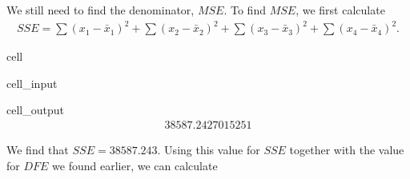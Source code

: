 \documentclass[letterpaper,10pt,english]{jupyterBook}
\begin{document}
\sphinxAtStartPar
We still need to find the denominator, \(MSE\). To find \(MSE\), we first calculate
\begin{equation*}
\begin{split}SSE = \sum (x_1 - \bar{x}_1)^2 + \sum (x_2 - \bar{x}_2)^2 + \sum (x_3 - \bar{x}_3)^2 + \sum(x_4 - \bar{x}_4)^2.\end{split}
\end{equation*}
\begin{sphinxuseclass}{cell}\begin{sphinxVerbatimInput}

\begin{sphinxuseclass}{cell_input}
\begin{sphinxVerbatim}[commandchars=\\\{\}]
\end{sphinxVerbatim}

\end{sphinxuseclass}\end{sphinxVerbatimInput}
\begin{sphinxVerbatimOutput}

\begin{sphinxuseclass}{cell_output}\begin{equation*}
\begin{split}38587.2427015251\end{split}
\end{equation*}
\end{sphinxuseclass}\end{sphinxVerbatimOutput}

\end{sphinxuseclass}
\sphinxAtStartPar
We find that \(SSE = 38587.243\). Using this value for \(SSE\) together with the value for \(DFE\) we found earlier, we can calculate
\end{document}
